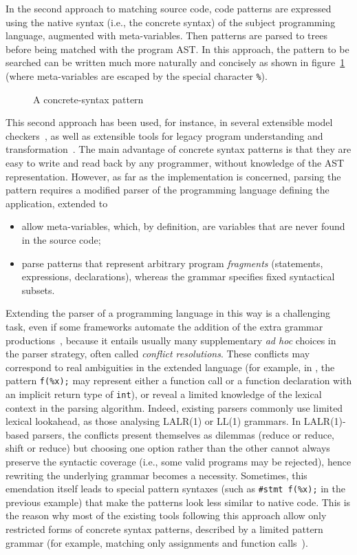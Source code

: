 In the second approach to matching source code, code patterns are
expressed using the native syntax (i.e., the concrete syntax) of the
subject programming language, augmented with meta\hyp{}variables. Then
patterns are parsed to trees before being matched with the program
AST. In this approach, the pattern to be searched can be written much
more naturally and concisely as shown in
figure~\ref{intro:concrete_pattern} (where meta\hyp{}variables are
escaped by the special character \texttt{\%}).
\begin{figure}[H]
%
\caption{A concrete\hyp{}syntax pattern\label{intro:concrete_pattern}}
\end{figure}
\noindent This second approach has been used, for instance, in several
extensible model checkers~\cite{cecil, mc, mj, blast}, as well as
extensible tools for legacy program understanding and
transformation~\cite{native, behavioral}. The main advantage of
concrete syntax patterns is that they are easy to write and read back
by any programmer, without knowledge of the AST
representation. However, as far as the implementation is concerned,
parsing the pattern requires a modified parser of the programming
language defining the application, extended to
\begin{itemize}

  \item allow meta\hyp{}variables, which, by definition, are variables
    that are never found in the source code;

  \item parse patterns that represent arbitrary program
    \emph{fragments} (statements, expressions, declarations), whereas
    the grammar specifies fixed syntactical subsets.
\end{itemize}
Extending the parser of a programming language in this way is a
challenging task, even if some frameworks automate the addition of the
extra grammar productions~\cite{refine}, because it entails usually
many supplementary \emph{ad hoc} choices in the parser strategy, often
called \emph{conflict resolutions}. These conflicts may correspond to
real ambiguities in the extended language (for example, in \Clang, the
pattern \texttt{f(\%x);} may represent either a function call or a
function declaration with an implicit return type of \texttt{int}), or
reveal a limited knowledge of the lexical context in the parsing
algorithm. Indeed, existing parsers commonly use limited lexical
lookahead, as those analysing LALR(1) or LL(1) grammars. In
LALR(1)\hyp{}based parsers, the conflicts present themselves as
dilemmas (reduce or reduce, shift or reduce) but choosing one option
rather than the other cannot always preserve the syntactic coverage
(i.e., some valid programs may be rejected), hence rewriting the
underlying grammar becomes a necessity. Sometimes, this emendation
itself leads to special pattern syntaxes (such as \texttt{\#stmt
f(\%x);} in the previous example) that make the patterns look less
similar to native code. This is the reason why most of the existing
tools following this approach allow only restricted forms of concrete
syntax patterns, described by a limited pattern grammar (for example,
matching only assignments and function calls~\cite{blast-ql}).

